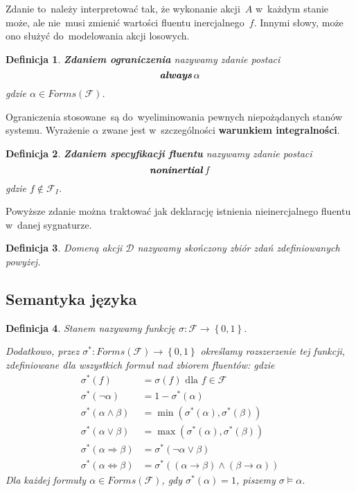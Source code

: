 \documentclass[11pt,a4paper]{article}
\newtheorem{defn}{Definicja}
\DeclareMathOperator{\Always}{\textbf{\textit{always}}}
\DeclareMathOperator{\Noninertial}{\textbf{\textit{noninertial}}}
\begin{document}
Zdanie to~należy interpretować tak, że wykonanie akcji~$A$ w~każdym stanie może, ale nie~musi zmienić wartości fluentu inercjalnego~$f$.
Innymi słowy, może ono służyć do~modelowania akcji losowych.

\begin{defn}
    \textbf{Zdaniem ograniczenia} nazywamy zdanie postaci
    $$ \Always \alpha $$
    gdzie $\alpha \in Forms(\mathcal{F})$.
\end{defn}

Ograniczenia stosowane~są do~wyeliminowania pewnych niepożądanych stanów systemu.
Wyrażenie $\alpha$ zwane jest w~szczególności \textbf{warunkiem integralności}.

\begin{defn}
    \textbf{Zdaniem specyfikacji fluentu} nazywamy zdanie postaci
    $$ \Noninertial f $$
    gdzie $f \notin \mathcal{F}_I$. 
\end{defn}

Powyższe zdanie można traktować jak deklarację istnienia nieinercjalnego fluentu w~danej sygnaturze.

\begin{defn}
    Domeną akcji $\mathcal{D}$ nazywamy skończony zbiór zdań zdefiniowanych powyżej.
\end{defn}

\subsection{Semantyka języka}

\begin{defn}
    Stanem nazywamy funkcję $\sigma : \mathcal{F} \rightarrow \left\{0,1\right\}$.

    Dodatkowo, przez $\sigma^{*} : Forms(\mathcal{F}) \rightarrow \left\{0,1\right\}$ określamy rozszerzenie tej funkcji, zdefiniowane dla wszystkich formuł nad zbiorem fluentów:
    gdzie
    \begin{align*}
        \sigma^{*}\left(f\right) &= \sigma\left(f\right) \text{ dla } f \in \mathcal{F} \\
        \sigma^{*}\left(\neg \alpha\right) &= 1 - \sigma^{*}\left(\alpha\right) \\
        \sigma^{*}\left(\alpha \land \beta\right) &= \min \left(\sigma^{*}\left(\alpha\right),\sigma^{*}\left(\beta\right)\right) \\
        \sigma^{*}\left(\alpha \lor \beta\right) &= \max \left(\sigma^{*}\left(\alpha\right),\sigma^{*}\left(\beta\right)\right) \\
        \sigma^{*}\left(\alpha \Rightarrow \beta\right) &= \sigma^{*}\left(\neg \alpha \lor \beta\right) \\
        \sigma^{*}\left(\alpha \Leftrightarrow \beta\right) &= \sigma^{*}\left(\left(\alpha \rightarrow \beta\right)\land\left(\beta \rightarrow \alpha\right)\right)
    \end{align*}
    Dla każdej formuły $\alpha \in Forms\left(\mathcal{F}\right)$, gdy $\sigma^*\left(\alpha\right) = 1$, piszemy $\sigma \models \alpha$.
\end{defn}
\end{document}
